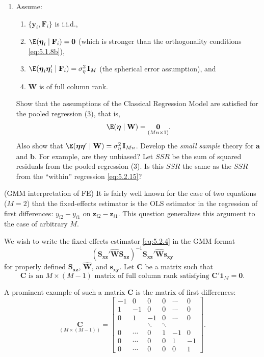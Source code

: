 \begin{problemset}
\begin{enumerate}[label=(\alph*)]
\item Assume:
  \begin{enumerate}[label=(\roman*)]
  \item $\{\mathbf{y}_i, \mathbf{F}_i\}$ is i.i.d.,
  \item $\E(\boldsymbol{\eta}_i \mid \mathbf{F}_i) = \mathbf{0}$
    (which is stronger than the orthogonality conditions \eqref{eq:5.1.8b}),
  \item $\E(\boldsymbol{\eta}_i\boldsymbol{\eta}_i' \mid \mathbf{F}_i)
    = \sigma_\eta^2\,\mathbf{I}_M$ (the spherical error assumption), and
  \item $\mathbf{W}$ is of full column rank.
  \end{enumerate}
  Show that the assumptions of the Classical Regression Model are satisfied
  for the pooled regression (3), that is,
  \[
    \E(\boldsymbol{\eta} \mid \mathbf{W}) = \underset{(Mn \times 1)}{\mathbf{0}}.
  \]
  Also show that $\E(\boldsymbol{\eta}\boldsymbol{\eta}' \mid \mathbf{W}) = \sigma_\eta^2\,\mathbf{I}_{Mn}$.
  Develop the \emph{small sample} theory for
  $\mathbf{a}$ and $\mathbf{b}$. For example, are they unbiased? Let $SSR$ be the sum of squared
  residuals from the pooled regression (3). Is this $SSR$ the same as the $SSR$
  from the ``within'' regression \eqref{eq:5.2.15}?
\end{enumerate}

\exercise[2]
(GMM interpretation of FE)\quad
It is fairly well known for the case of two equations
($M = 2$) that the fixed-effects estimator is the OLS estimator in the
regression of first differences: $y_{i2} - y_{i1}$ on $\mathbf{z}_{i2} - \mathbf{z}_{i1}$.
This question generalizes
this argument to the case of arbitrary $M$.

We wish to write the fixed-effects estimator \eqref{eq:5.2.4} in the GMM format
\begin{equation}
  (\mathbf{S}_{\mathbf{xz}}'\hat{\mathbf{W}}\mathbf{S}_{\mathbf{xz}})^{-1}
  \mathbf{S}_{\mathbf{xz}}'\hat{\mathbf{W}}\mathbf{s}_{\mathbf{xy}} \tag{7}
\end{equation}
for properly defined $\mathbf{S}_{\mathbf{xz}}$, $\hat{\mathbf{W}}$, and $\mathbf{s}_{\mathbf{xy}}$.
Let $\mathbf{C}$ be a matrix such that
\begin{equation}
  \text{$\mathbf{C}$ is an $M \times (M-1)$ matrix of full column rank satisfying }
  \mathbf{C}'\mathbf{1}_M = \mathbf{0}. \tag{8}
\end{equation}

A prominent example of such a matrix $\mathbf{C}$ is the matrix of first differences:
\[
  \underset{(M \times (M-1))}{\mathbf{C}} = \begin{bmatrix}
    -1 & 0 & 0 & 0 & \cdots & 0 \\
    1 & -1 & 0 & 0 & \cdots & 0 \\
    0 & 1 & -1 & 0 & \cdots & 0 \\
    & & \ddots & \ddots & & \\
    0 & \cdots & 0 & 1 & -1 & 0 \\
    0 & \cdots & 0 & 0 & 1 & -1 \\
    0 & \cdots & 0 & 0 & 0 & 1
  \end{bmatrix}.
\]


\end{problemset}
